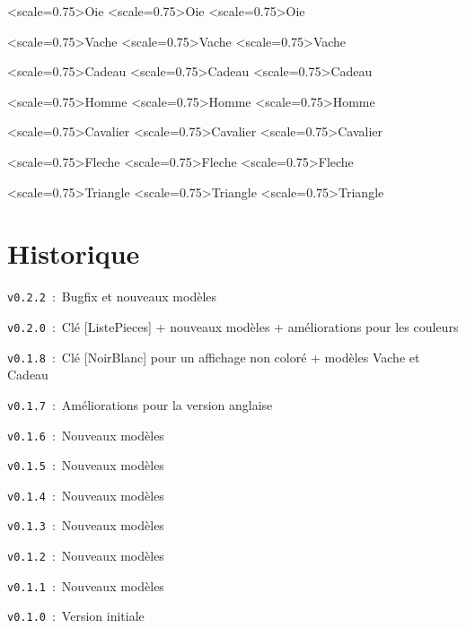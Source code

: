 \documentclass{article}
\begin{document}
\begin{PresentationCode}{}
\TangramTikz<scale=0.75>{Oie}
\TangramTikz[Correction]<scale=0.75>{Oie}
\TangramTikz[CorrectionCouleur]<scale=0.75>{Oie}
\end{PresentationCode}

\begin{PresentationCode}{}
\TangramTikz<scale=0.75>{Vache}
\TangramTikz[Correction]<scale=0.75>{Vache}
\TangramTikz[CorrectionCouleur]<scale=0.75>{Vache}
\end{PresentationCode}

\begin{PresentationCode}{}
\TangramTikz<scale=0.75>{Cadeau}
\TangramTikz[Correction]<scale=0.75>{Cadeau}
\TangramTikz[CorrectionCouleur]<scale=0.75>{Cadeau}
\end{PresentationCode}

\begin{PresentationCode}{}
\TangramTikz<scale=0.75>{Homme}
\TangramTikz[Correction]<scale=0.75>{Homme}
\TangramTikz[CorrectionCouleur]<scale=0.75>{Homme}
\end{PresentationCode}

\begin{PresentationCode}{}
\TangramTikz<scale=0.75>{Cavalier}
\TangramTikz[Correction]<scale=0.75>{Cavalier}
\TangramTikz[CorrectionCouleur]<scale=0.75>{Cavalier}
\end{PresentationCode}

\begin{PresentationCode}{}
\TangramTikz<scale=0.75>{Fleche}
\TangramTikz[Correction]<scale=0.75>{Fleche}
\TangramTikz[CorrectionCouleur]<scale=0.75>{Fleche}
\end{PresentationCode}

\begin{PresentationCode}{}
\TangramTikz<scale=0.75>{Triangle}
\TangramTikz[Correction]<scale=0.75>{Triangle}
\TangramTikz[CorrectionCouleur]<scale=0.75>{Triangle}
\end{PresentationCode}

\newpage

\part{Historique}

\verb|v0.2.2|~:~Bugfix et nouveaux modèles

\verb|v0.2.0|~:~Clé \textsf{[ListePieces]}  + nouveaux modèles + améliorations pour les couleurs

\verb|v0.1.8|~:~Clé \textsf{[NoirBlanc]} pour un affichage non coloré + modèles \textsf{Vache} et \textsf{Cadeau}

\verb|v0.1.7|~:~Améliorations pour la version anglaise

\verb|v0.1.6|~:~Nouveaux modèles

\verb|v0.1.5|~:~Nouveaux modèles

\verb|v0.1.4|~:~Nouveaux modèles

\verb|v0.1.3|~:~Nouveaux modèles

\verb|v0.1.2|~:~Nouveaux modèles

\verb|v0.1.1|~:~Nouveaux modèles

\verb|v0.1.0|~:~Version initiale
\end{document}
